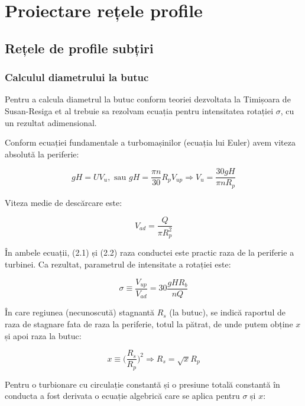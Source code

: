 \chapter{Proiectare rețele profile}\label{chapter:proiectare}

\section{Rețele de profile subțiri}

\subsection{Calculul diametrului la butuc}

Pentru a calcula diametrul la butuc conform teoriei dezvoltata la Timișoara de Susan-Resiga et al \cite{susanhub} trebuie sa rezolvam ecuația pentru intensitatea rotației $\sigma$, cu un rezultat adimensional.

Conform ecuației fundamentale a turbomașinilor (ecuația lui Euler) avem viteza absolută la periferie:

\begin{equation}
gH=UV_{u}, \text{ sau } gH=\frac{\pi n}{30} R_{p} V_{up} \Rightarrow V_{u}=\frac{30gH}{\pi n R_{p}}
\end{equation}

Viteza medie de descărcare este:

\begin{equation}
V_{ad}=\frac{Q}{\pi R_{p}^2}
\end{equation}

În ambele ecuații, (2.1) și (2.2) raza conductei este practic raza de la periferie a turbinei. Ca rezultat, parametrul de intensitate a rotației este:

\begin{equation}
\sigma \equiv \frac{V_{up}}{V_{ad}} = 30 \frac{g H R_{b}}{n Q}
\end{equation}

În care regiunea (necunoscută) stagnantă $R_{s}$ (la butuc), se indică raportul de raza de stagnare fata de raza la periferie, totul la pătrat, de unde putem obține $x$ și apoi raza la butuc:

\begin{equation}
x \equiv \bigg(\frac{R_{s}}{R_{p}}\bigg)^2 \Rightarrow R_{s} = \sqrt{x} R_{p}
\end{equation}

Pentru o turbionare cu circulație constantă și o presiune totală constantă în conducta a fost derivata \cite{susanhub} o ecuație algebrică care se aplica pentru $\sigma$ și $x$:

